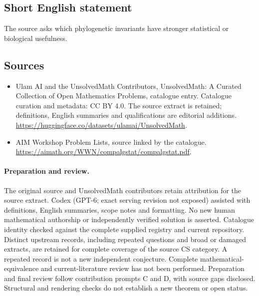\documentclass[11pt]{article}
\begin{document}
\subsection{Short English statement}
The source asks which phylogenetic invariants have stronger statistical or biological usefulness.
\subsection{Sources}
\begin{itemize}
\item[\hypertarget{source:statement:1}{S1}] Ulam AI and the UnsolvedMath Contributors, UnsolvedMath: A Curated Collection of Open Mathematics Problems, catalogue entry. Catalogue curation and metadata: CC BY 4.0. The source extract is retained; definitions, English summaries and qualifications are editorial additions.
\url{https://huggingface.co/datasets/ulamai/UnsolvedMath}.
\item[\hypertarget{source:statement:2}{S2}] AIM Workshop Problem Lists, source linked by the catalogue.
\url{https://aimath.org/WWN/compalgstat/compalgstat.pdf}.
\end{itemize}
\paragraph{Preparation and review.}
The original source and UnsolvedMath contributors retain attribution for the source extract. Codex (GPT-6; exact serving revision not exposed) assisted with definitions, English summaries, scope notes and formatting. No new human mathematical authorship or independently verified solution is asserted. Catalogue identity checked against the complete supplied registry and current repository. Distinct upstream records, including repeated questions and broad or damaged extracts, are retained for complete coverage of the source CS category. A repeated record is not a new independent conjecture. Complete mathematical-equivalence and current-literature review has not been performed. Preparation and final review follow contribution prompts C and D, with source gaps disclosed. Structural and rendering checks do not establish a new theorem or open status.
\label{end:statement}
\end{document}
